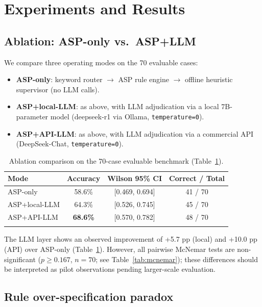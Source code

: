 \documentclass[pdflatex,sn-basic,Numbered]{sn-jnl}
\begin{document}
\section{Experiments and Results}\label{sec:results}

\subsection{Ablation: ASP-only vs.\ ASP+LLM}\label{subsec:ablation}

We compare three operating modes on the 70 evaluable cases:
\begin{itemize}
  \item \textbf{ASP-only}: keyword router $\rightarrow$ ASP rule engine $\rightarrow$ offline heuristic supervisor (no LLM calls).
  \item \textbf{ASP+local-LLM}: as above, with LLM adjudication via a local 7B-parameter model (deepseek-r1 via Ollama, \texttt{temperature=0}).
  \item \textbf{ASP+API-LLM}: as above, with LLM adjudication via a commercial API (DeepSeek-Chat, \texttt{temperature=0}).
\end{itemize}

\begin{table}[t]
\caption{Ablation comparison on the 70-case evaluable benchmark (Table~\ref{tab:ablation}).}\label{tab:ablation}
\begin{tabular*}{\textwidth}{@{\extracolsep\fill}lccc}
\toprule
Mode & Accuracy & Wilson 95\% CI & Correct / Total \\
\midrule
ASP-only & 58.6\% & [0.469, 0.694] & 41 / 70 \\
ASP+local-LLM & 64.3\% & [0.526, 0.745] & 45 / 70 \\
ASP+API-LLM & \textbf{68.6\%} & [0.570, 0.782] & 48 / 70 \\
\botrule
\end{tabular*}
\end{table}

The LLM layer shows an observed improvement of +5.7 pp (local) and +10.0 pp (API) over ASP-only (Table~\ref{tab:ablation}).
However, all pairwise McNemar tests are non-significant ($p \geq 0.167$, $n=70$; see Table~\ref{tab:mcnemar}); these differences should be interpreted as pilot observations pending larger-scale evaluation.

\subsection{Rule over-specification paradox}\label{subsec:overspec}
\end{document}
